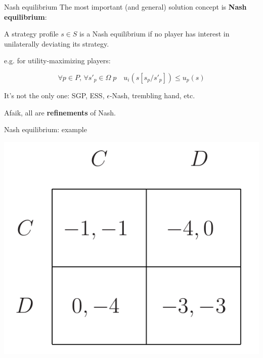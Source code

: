 \begin{frame}{Nash equilibrium}
	The most important (and general) solution concept is \textbf{Nash equilibrium}:

	\vfill
	\begin{definition}
		A strategy profile $s \in S$ is a Nash equilibrium if no player has interest in unilaterally deviating its strategy.
	\end{definition}

	\vfill
	e.g. for utility-maximizing players:

	\begin{equation*}
		\forall p \in P,\, \forall s'_p \in \Omega\; p \quad u_i(s[s_p/s'_p]) \leq u_p(s)
	\end{equation*}

	\vfill
	It's not the only one: SGP, ESS, $\epsilon$-Nash, trembling hand, etc.

	Afaik, all are \textbf{refinements} of Nash.
\end{frame}

\begin{frame}{Nash equilibrium: example}
	\begin{center}
		\includegraphics[width=.6\textwidth]{figures/pd_norm.png}
	\end{center}
\end{frame}

